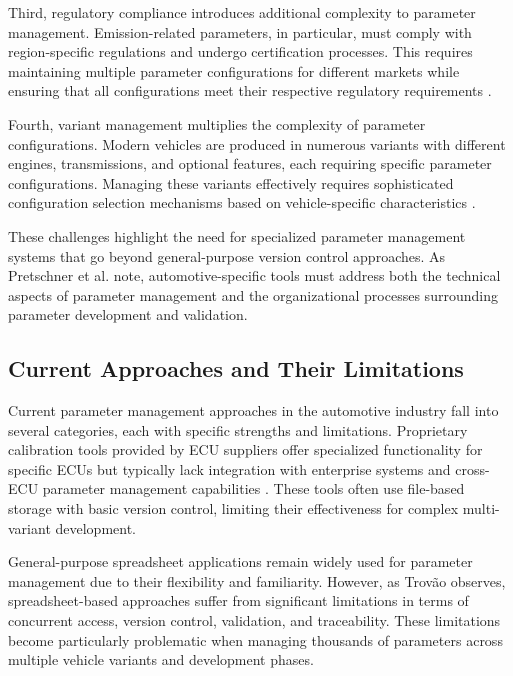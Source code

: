 Third, regulatory compliance introduces additional complexity to parameter management. Emission-related parameters, in particular, must comply with region-specific regulations and undergo certification processes. This requires maintaining multiple parameter configurations for different markets while ensuring that all configurations meet their respective regulatory requirements \cite{trovao2024evolution}.

Fourth, variant management multiplies the complexity of parameter configurations. Modern vehicles are produced in numerous variants with different engines, transmissions, and optional features, each requiring specific parameter configurations. Managing these variants effectively requires sophisticated configuration selection mechanisms based on vehicle-specific characteristics \cite{broy2006challenges}.

These challenges highlight the need for specialized parameter management systems that go beyond general-purpose version control approaches. As Pretschner et al. \cite{pretschner2007software} note, automotive-specific tools must address both the technical aspects of parameter management and the organizational processes surrounding parameter development and validation.

\subsection{Current Approaches and Their Limitations}
\label{subsec:current-approaches-limitations}

Current parameter management approaches in the automotive industry fall into several categories, each with specific strengths and limitations. Proprietary calibration tools provided by ECU suppliers offer specialized functionality for specific ECUs but typically lack integration with enterprise systems and cross-ECU parameter management capabilities \cite{staron2021automotive}. These tools often use file-based storage with basic version control, limiting their effectiveness for complex multi-variant development.

General-purpose spreadsheet applications remain widely used for parameter management due to their flexibility and familiarity. However, as Trovão \cite{trovao2024evolution} observes, spreadsheet-based approaches suffer from significant limitations in terms of concurrent access, version control, validation, and traceability. These limitations become particularly problematic when managing thousands of parameters across multiple vehicle variants and development phases.

